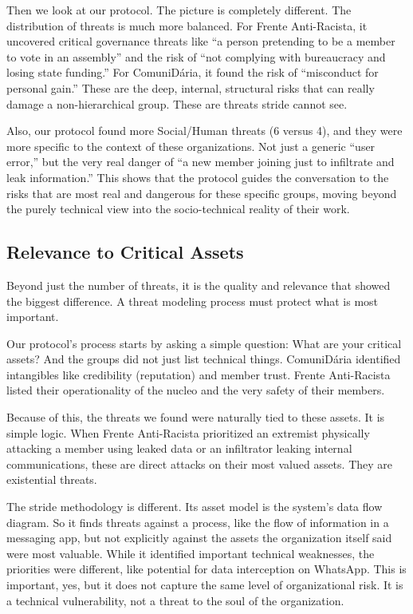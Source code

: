 Then we look at our protocol. The picture is completely different. The
distribution of threats is much more balanced. For Frente Anti-Racista, it
uncovered critical governance threats like “a person pretending to be a member
to vote in an assembly” and the risk of “not complying with bureaucracy and
losing state funding.” For ComuniDária, it found the risk of “misconduct for
personal gain.” These are the deep, internal, structural risks that can really
damage a non-hierarchical group. These are threats \gls{stride} cannot see.

Also, our protocol found more Social/Human threats (6 versus 4), and they were
more specific to the context of these organizations. Not just a generic “user
error,” but the very real danger of “a new member joining just to infiltrate and
leak information.” This shows that the protocol guides the conversation to the
risks that are most real and dangerous for these specific groups, moving beyond
the purely technical view into the socio-technical reality of their work.

\subsection{Relevance to Critical Assets}
\label{subsec:threat_quality_relevance}

Beyond just the number of threats, it is the quality and relevance that showed
the biggest difference. A threat modeling process must protect what is most
important.

Our protocol's process starts by asking a simple question: What are your
critical assets? And the groups did not just list technical things. ComuniDária
identified intangibles like credibility (reputation) and member trust.
Frente Anti-Racista listed their operationality of the nucleo and the very
safety of their members.

Because of this, the threats we found were naturally tied to these assets. It is
simple logic. When Frente Anti-Racista prioritized an extremist physically
attacking a member using leaked data or an infiltrator leaking internal
communications, these are direct attacks on their most valued assets. They are
existential threats.

The \gls{stride} methodology is different. Its asset model is the system's data
flow diagram. So it finds threats against a process, like the flow of
information in a messaging app, but not explicitly against the assets the
organization itself said were most valuable. While it identified important
technical weaknesses, the priorities were different, like potential for data
interception on WhatsApp. This is important, yes, but it does not capture the
same level of organizational risk. It is a technical vulnerability, not a threat
to the soul of the organization.


